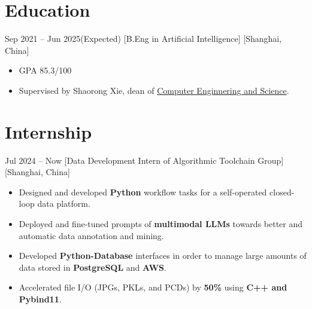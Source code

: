 \documentclass{chicv}
\begin{document}
\begin{basicinfo}
\end{basicinfo}


\section{Education}
  {Sep 2021 -- Jun 2025(Expected)}
  [B.Eng in Artificial Intelligence]
  [Shanghai, China]
  \begin{itemize}
    \item GPA 85.3/100
    \item Supervised by Shaorong Xie, dean of \href{https://cs.shu.edu.cn/}{Computer Enginnering and Science}.
  \end{itemize}



\section{Internship}
{Jul 2024 -- Now}
  [Data Development Intern of Algorithmic Toolchain Group]
  [Shanghai, China]
  \begin{itemize}
    \item Designed and developed \textbf{Python} workflow tasks for a self-operated closed-loop data platform.
    \item Deployed and fine-tuned prompts of \textbf{multimodal LLMs} towards better and automatic data annotation and mining.
    \item Developed \textbf{Python-Database} interfaces in order to manage large amounts of data stored in \textbf{PostgreSQL} and \textbf{AWS}.
    \item Accelerated file I/O (JPGs, PKLs, and PCDs) by \textbf{50\%} using \textbf{C++ and Pybind11}.
  \end{itemize}
\end{document}
